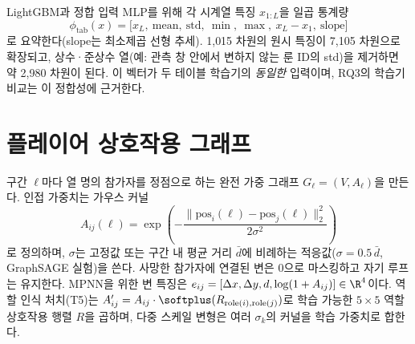 LightGBM과 정합 입력 MLP를 위해 각 시계열 특징 $x_{1:L}$을 일곱 통계량
\begin{equation}
  \phi_{\mathrm{tab}}(x) = \big[x_L,\ \mathrm{mean},\ \mathrm{std},\ \min,\ \max,\ x_L - x_1,\ \mathrm{slope}\big]
  \label{eq:phitab}
\end{equation}
로 요약한다(slope는 최소제곱 선형 추세). 1{,}015 차원의 원시 특징이 7{,}105 차원으로 확장되고, 상수·준상수 열(예: 관측 창 안에서 변하지 않는 룬 ID의 std)을 제거하면 약 2{,}980 차원이 된다. 이 벡터가 두 테이블 학습기의 \emph{동일한} 입력이며, RQ3의 학습기 비교는 이 정합성에 근거한다.

\section{플레이어 상호작용 그래프}
\label{sec:feat-graph}

구간 $\ell$마다 열 명의 참가자를 정점으로 하는 완전 가중 그래프 $G_\ell = (V, A_\ell)$을 만든다. 인접 가중치는 가우스 커널
\begin{equation}
  A_{ij}(\ell) = \exp\!\left(-\frac{\|\mathrm{pos}_i(\ell) - \mathrm{pos}_j(\ell)\|_2^2}{2\sigma^2}\right)
  \label{eq:adjacency}
\end{equation}
로 정의하며, $\sigma$는 고정값 또는 구간 내 평균 거리 $\bar d$에 비례하는 적응값($\sigma = 0.5\,\bar d$, GraphSAGE 실험)을 쓴다. 사망한 참가자에 연결된 변은 0으로 마스킹하고 자기 루프는 유지한다. MPNN을 위한 변 특징은 $e_{ij} = [\Delta x, \Delta y, d, \log(1+A_{ij})] \in \R^4$이다. 역할 인식 처치(T5)는 $A'_{ij} = A_{ij}\cdot\softplus(R_{\mathrm{role}(i),\mathrm{role}(j)})$로 학습 가능한 $5\times 5$ 역할 상호작용 행렬 $R$을 곱하며, 다중 스케일 변형은 여러 $\sigma_k$의 커널을 학습 가중치로 합한다.
